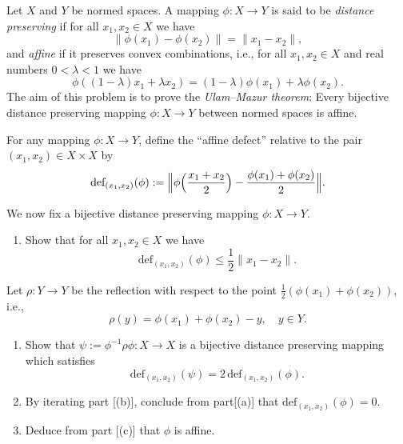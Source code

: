 \def \lflr{\left\lfloor} %
\def \rflr{\right\rfloor} %
\newcommand{\n}{{\|}}

\newcommand{\la}{\lambda}

\begin{problem}
    Let $X$ and $Y$ be normed spaces. A mapping $\phi:X\to Y$ is said to be {\em distance preserving} if for all $x_1,x_2\in X$ we have $$\n \phi (x_1)-\phi(x_2)\n = \n x_1-x_2\n,$$ and {\em affine} if it preserves convex combinations, i.e., for all $x_1,x_2\in X$ and real numbers $0<\la<1$ we have $$\phi ((1-\la)x_1+\la x_2) = (1-\la)\phi (x_1) + \la \phi (x_2).$$
The aim of this problem is to prove the
{\em Ulam--Mazur theorem}: Every bijective distance preserving mapping $\phi :X\to Y$ between normed spaces is affine.

For any mapping $\phi:X\to Y$, define the ``affine defect'' relative to the pair $(x_1,x_2)\in X\times X$ by
\[
\text{def}_{(x_1,x_2)}(\phi) := \Bigl\|\phi\Bigl(\frac{x_1 + x_2}{2}\Bigr) - \frac{\phi(x_1) + \phi(x_2)}{2}\Bigr\|.
\]

We now fix a bijective distance preserving mapping $\phi:X\to Y$.

\begin{enumerate}
 \item[(a)] \label{it:Ulam-Mazur1} Show that for all $x_1,x_2\in X$ we have $$\text{def}_{(x_1,x_2)}(\phi) \leq \frac{1}{2}\|x_1 - x_2\|.$$
\end{enumerate}
Let $\rho:Y\to Y$ be the reflection with respect to the point $\frac12(\phi(x_1) + \phi(x_2))$, i.e., $$\rho(y) = \phi(x_1) + \phi(x_2) - y, \quad y\in Y.$$
\begin{enumerate}
\item[(b)]\label{it:Ulam-Mazur2}  Show that $\psi := \phi^{-1}\rho\phi: X\to X$ is a bijective distance preserving mapping which satisfies
$$ \text{def}_{(x_1,x_2)}(\psi) =2 \,\text{def}_{(x_1,x_2)}(\phi).$$
\item[(c)]\label{it:Ulam-Mazur3}  By iterating part [(b)], conclude from part[(a)] that
$\text{def}_{(x_1,x_2)}(\phi)= 0$.
\item[(d)]\label{it:Ulam-Mazur4} Deduce from part [(c)] that $\phi$ is affine.
\end{enumerate}

\end{problem}

